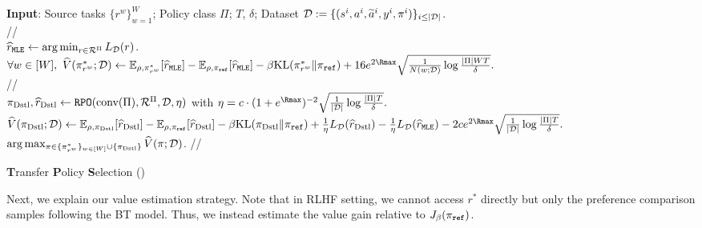 \begin{algorithm*}[t]
    \textbf{Input}: Source tasks $\{r^w\}_{w=1}^W$; Policy class $\Pi$; $T$, $\delta$; Dataset $\mathcal{D}:=\{(s^i,a^i,\widetilde{a}^i,y^i,\pi^i)\}_{i\leq|\mathcal{D}|}$. \\
    //  \\
    ${\widehat{r}}_{\texttt{MLE}} \gets \arg\min_{r\in\mathcal{R}^\Pi} L_{\mathcal{D}}(r)$. \label{line:MLE}\\
    $\forall w\in [W],~\hat{V}(\pi^*_{r^w};\cD) \gets \EE_{\rho,\pi^*_{r^w}}[\hr_\MLE] - \EE_{\rho,\pi_\textref}[\hr_\MLE] - \beta \KL(\pi^*_{r^w}\|\pi_\textref) + 16 e^{2{\Rmax}} \sqrt{\frac{1}{N(w;\cD)} \log\frac{|\Pi|WT}{\delta}}.$ \label{line:counter_N}\\
    //  \\
    $\pi_{\text{Dstl}}, {\widehat{r}}_{\text{Dstl}} \gets {\texttt{RPO}}(\text{conv}(\Pi),\mathcal{R}^{\Pi},\mathcal{D},\eta)$ with $\eta = c\cdot (1+e^{{\Rmax}})^{-2} \sqrt{\frac{1}{|\cD|}\log\frac{|\Pi|T}{\delta}}.$
    \label{line:RPO}\\
    $\hV(\pi_\SELF;\cD) \gets \EE_{\rho,\pi_\SELF}[\hr_\SELF] - \EE_{\rho,\pi_\textref}[\hr_\SELF] - \beta \KL(\pi_\SELF\|\pi_\textref) + \frac{1}{\eta} L_{\cD}(\hr_\SELF) - \frac{1}{\eta} L_{\cD}(\hr_\MLE) - 2c e^{2{\Rmax}} \sqrt{\frac{1}{|\cD|}\log\frac{|\Pi|T}{\delta}}.$ \label{line:LB_pi_value}\\
    \Return $\arg\max_{\pi \in \{\pi^*_{r^w}\}_{w\in[W]} \cup \{\pi_{\text{Dstl}}\}} \widehat{V}(\pi;\mathcal{D}) $. // 
    \caption{\textbf{T}ransfer \textbf{P}olicy \textbf{S}election (\TPS)}\label{alg:transfer_policy_computing}
\end{algorithm*}

Next, we explain our value estimation strategy.
Note that in RLHF setting, we cannot access $r^*$ directly but only the preference comparison samples following the BT model.
Thus, we instead estimate the value gain relative to $J_\beta(\pi_{\texttt{ref}})$.

